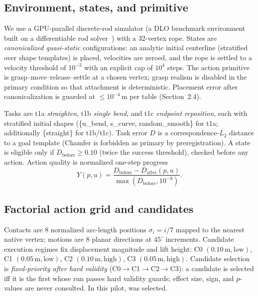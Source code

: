 \documentclass{article}
\begin{document}
\subsection{Environment, states, and primitive}
We use a GPU-parallel discrete-rod simulator (a DLO benchmark environment
built on a differentiable rod solver~\citep{cao2026dlolab}) with a 32-vertex
rope. States are \emph{canonicalized quasi-static} configurations: an analytic
initial centerline (stratified over shape templates) is placed, velocities are
zeroed, and the rope is settled to a velocity threshold of $10^{-3}$ with an
explicit cap of $10^4$ steps. The action primitive is grasp--move--release--settle
at a chosen vertex; grasp realism is disabled in the primary condition so that
attachment is deterministic. Placement error after canonicalization is guarded
at $\le 10^{-4}$\,m per table (Section~2.4).

Tasks are t1a \emph{straighten}, t1b \emph{single bend}, and t1c
\emph{endpoint reposition}, each with stratified initial shapes
(\{u\_bend, s\_curve, random\_smooth\} for t1a; additionally \{straight\} for
t1b/t1c). Task error $D$ is a correspondence-$L_2$ distance to a goal template
(Chamfer is forbidden as primary by preregistration). A state is eligible only
if $D_{\text{before}} \ge 0.10$ (twice the success threshold), checked before
any action. Action quality is normalized one-step progress
\begin{equation}
Y(p,u) = \frac{D_{\text{before}} - D_{\text{after}}(p,u)}
              {\max(D_{\text{before}}, 10^{-8})}.
\end{equation}

\subsection{Factorial action grid and candidates}
Contacts are 8 normalized arc-length positions $\sigma_i = i/7$ mapped to the
nearest native vertex; motions are 8 planar directions at $45^\circ$
increments. Candidate execution regimes fix displacement magnitude and lift
height: C0 $(0.10\,\text{m}, \text{low})$, C1 $(0.05\,\text{m}, \text{low})$,
C2 $(0.10\,\text{m}, \text{high})$, C3 $(0.05\,\text{m}, \text{high})$.
Candidate selection is \emph{fixed-priority after hard validity}
(C0$\to$C1$\to$C2$\to$C3): a candidate is selected iff it is the first whose
run passes hard validity guards; effect size, sign, and $p$-values are never
consulted. In this pilot, \selcand{} was selected\selcandreason{}.
\end{document}
